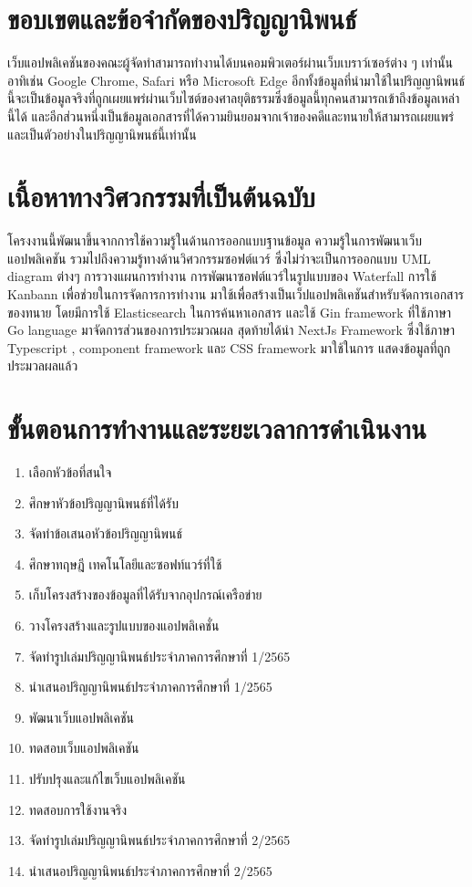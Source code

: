 \documentclass[12pt,oneside,openright,a4paper]{cpe-thai-project}
\begin{document}
\section{ขอบเขตและข้อจำกัดของปริญญานิพนธ์}
\hspace*{1cm}เว็บแอปพลิเคชันของคณะผู้จัดทำสามารถทำงานได้บนคอมพิวเตอร์ผ่านเว็บเบราว์เซอร์ต่าง ๆ เท่านั้นอาทิเช่น Google Chrome, Safari หรือ Microsoft Edge อีกทั้งข้อมูลที่นำมาใช้ในปริญญานิพนธ์นี้จะเป็นข้อมูลจริงที่ถูกเผยแพร่ผ่านเว็บไซต์ของศาลยุติธรรมซึ่งข้อมูลนี้ทุกคนสามารถเข้าถึงข้อมูลเหล่านี้ได้ และอีกส่วนหนึ่งเป็นข้อมูลเอกสารที่ได้ความยินยอมจากเจ้าของคดีและทนายให้สามารถเผยแพร่และเป็นตัวอย่างในปริญญานิพนธ์นี้เท่านั้น

\section{เนื้อหาทางวิศวกรรมที่เป็นต้นฉบับ}
\hspace*{1cm}โครงงานนี้พัฒนาขึ้นจากการใช้ความรู้ในด้านการออกแบบฐานข้อมูล ความรู้ในการพัฒนาเว็บแอปพลิเคชัน รวมไปถึงความรู้ทางด้านวิศวกรรมซอฟต์แวร์ ซึ่งไม่ว่าจะเป็นการออกแบบ UML diagram ต่างๆ การวางแผนการทำงาน การพัฒนาซอฟต์แวร์ในรูปแบบของ Waterfall การใช้ Kanbann เพื่อช่วยในการจัดการการทำงาน มาใช้เพื่อสร้างเป็นเว็ปแอปพลิเคชันสำหรับจัดการเอกสารของทนาย โดยมีการใช้ Elasticsearch ในการค้นหาเอกสาร และใช้ Gin framework ที่ใช้ภาษา Go language มาจัดการส่วนของการประมวณผล สุดท้ายได้นำ NextJs Framework ซึ่งใช้ภาษา Typescript , component framework และ CSS framework มาใช้ในการ แสดงข้อมูลที่ถูกประมวลผลแล้ว 

\newpage
\section{ขั้นตอนการทํางานและระยะเวลาการดําเนินงาน}
\begin{enumerate}
  \item เลือกหัวข้อที่สนใจ
  \item ศึกษาหัวข้อปริญญานิพนธ์ที่ได้รับ
  \item จัดทำข้อเสนอหัวข้อปริญญานิพนธ์
  \item ศึกษาทฤษฎี เทคโนโลยีและซอฟท์แวร์ที่ใช้
  \item เก็บโครงสร้างของข้อมูลที่ได้รับจากอุปกรณ์เครือข่าย
  \item วางโครงสร้างและรูปแบบของแอปพลิเคชั่น
  \item จัดทำรูปเล่มปริญญานิพนธ์ประจำภาคการศึกษาที่ 1/2565
  \item นำเสนอปริญญานิพนธ์ประจำภาคการศึกษาที่ 1/2565
  \item พัฒนาเว็บแอปพลิเคชัน
  \item ทดสอบเว็บแอปพลิเคชัน
  \item ปรับปรุงและแก้ไขเว็บแอปพลิเคชัน
  \item ทดสอบการใช้งานจริง
  \item จัดทำรูปเล่มปริญญานิพนธ์ประจำภาคการศึกษาที่ 2/2565
  \item นำเสนอปริญญานิพนธ์ประจำภาคการศึกษาที่ 2/2565
\end{enumerate}
\end{document}
